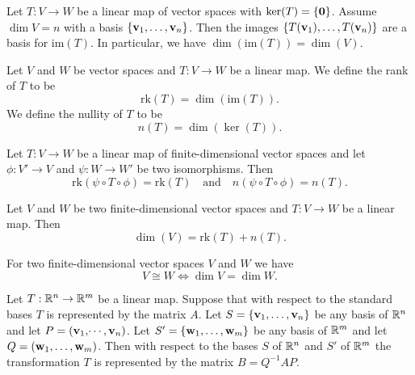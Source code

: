 \documentclass[10pt, a4paper]{article}
\begin{document}
\begin{corollary}
    Let $T : V \rightarrow W$ be a linear map of vector spaces with $\ker(T) = \{\mathbf{0}\}$.
    Assume $\dim{V} = n$ with a basis $\{\mathbf{v}_1, \dotsc, \mathbf{v}_n\}$.
    Then the images $\{T(\mathbf{v}_1), \dotsc, T(\mathbf{v}_n)\}$ are a basis for $\mathrm{im}(T)$.
    In particular,
    we have $\dim(\mathrm{im}(T)) = \dim(V)$.
\end{corollary}

\begin{definition}
    Let $V$ and $W$ be vector spaces and $T : V \rightarrow W$ be a linear map.
    We define the rank of $T$ to be
    \[
    \mathrm{rk}(T) = \dim(\mathrm{im}(T)).
    \]
    We define the nullity of $T$ to be
    \[
    n(T) = \dim(\ker(T)).
    \]
\end{definition}

\begin{proposition}
    Let $T : V \rightarrow W$ be a linear map of finite-dimensional vector spaces and let $\phi : V' \rightarrow V$ and $\psi : W \rightarrow W'$ be two isomorphisms.
    Then
    \[
    \mathrm{rk}(\psi \circ T \circ \phi) = \mathrm{rk}(T)\quad\text{and}\quad n(\psi \circ T \circ \phi) = n(T).
    \]
\end{proposition}

\begin{theorem}
    Let $V$ and $W$ be two finite-dimensional vector spaces and $T : V \rightarrow W$ be a linear map.
    Then
    \[
    \dim(V) = \mathrm{rk}(T) + n(T).
    \]
\end{theorem}

\begin{theorem}
    For two finite-dimensional vector spaces $V$ and $W$ we have
    \[
    V \cong W \iff \dim{V} = \dim{W}.
    \]
\end{theorem}

\begin{theorem}
    Let $T : \mathbb{R} ^ n \rightarrow \mathbb{R} ^ m$ be a linear map.
    Suppose that with respect to the standard bases $T$ is represented by the matrix $A$.
    Let $S = \{\mathbf{v}_1, \dotsc, \mathbf{v}_n\}$ be any basis of $\mathbb{R} ^ n$ and let $P = (\mathbf{v}_1, \dotsi, \mathbf{v}_n)$.
    Let $S' = \{\mathbf{w}_1, \dotsc, \mathbf{w}_m\}$ be any basis of $\mathbb{R} ^ m$ and let $Q = (\mathbf{w}_1, \dotsc, \mathbf{w}_m)$.
    Then with respect to the bases $S$ of $\mathbb{R} ^ n$ and $S'$ of $\mathbb{R} ^ m$ the transformation $T$ is represented by the matrix $B = Q ^ {-1}AP$.
\end{theorem}
\end{document}
